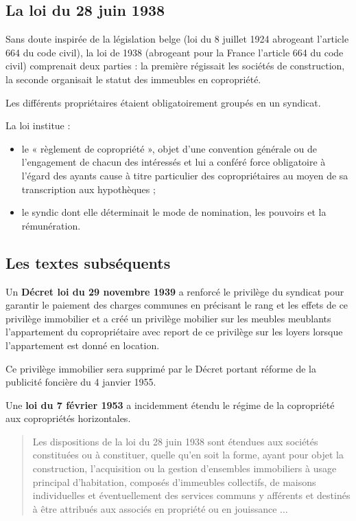 	\subsection{La loi du 28 juin 1938}
		Sans doute inspirée de la législation belge (loi du 8 juillet 1924 abrogeant l’article 664 du code civil), la loi de 1938 (abrogeant pour la France l’article 664 du code civil) comprenait deux parties : la première régissait les sociétés de construction, la seconde organisait le statut des immeubles en copropriété.
		
		Les différents propriétaires étaient obligatoirement groupés en un syndicat.
		
		La loi institue :
		\begin{itemize}
			\item  le « règlement de copropriété », objet d'une convention générale ou de l'engagement de chacun des intéressés et lui a conféré force obligatoire à l'égard des ayants cause à titre particulier des copropriétaires au moyen de sa transcription aux hypothèques ;
			\item  le syndic dont elle déterminait le mode de nomination, les pouvoirs et la rémunération.
		\end{itemize}
	
	\subsection{Les textes subséquents}
		Un \textbf{Décret loi du 29 novembre 1939} a renforcé le privilège du syndicat pour garantir le paiement des charges communes en précisant le rang et les effets de ce privilège immobilier et a créé un privilège mobilier sur les meubles meublants l'appartement du copropriétaire avec report de ce privilège sur les loyers lorsque l’appartement est donné en location.
		
		Ce privilège immobilier sera supprimé par le Décret portant réforme de la publicité foncière du 4 janvier 1955.
		
		Une \textbf{loi du 7 février 1953} a incidemment étendu le régime de la copropriété aux copropriétés horizontales.
		
		\begin{quote}
			Les dispositions de la loi du 28 juin 1938 sont étendues aux sociétés constituées ou à constituer, quelle qu'en soit la forme, ayant pour objet la construction, l'acquisition ou la gestion d'ensembles immobiliers à usage principal d'habitation, composés d'immeubles collectifs, de maisons individuelles et éventuellement des services communs y afférents et destinés à être attribués aux associés en propriété ou en jouissance $\dots$
		\end{quote}
		

